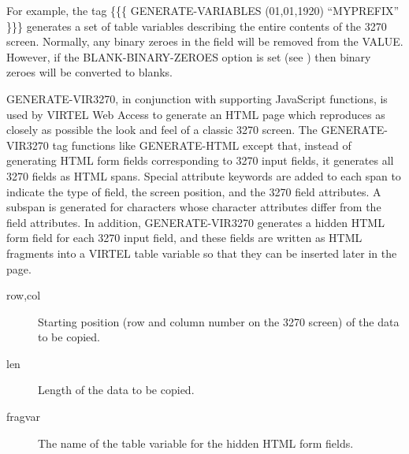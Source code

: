 \documentclass[letterpaper,10pt,english]{sphinxmanual}
\begin{document}
For example, the tag \{\{\{ GENERATE-VARIABLES (01,01,1920) “MYPREFIX” \}\}\} generates a set of table variables describing the entire contents of the 3270 screen. Normally, any binary zeroes in the field will be removed from the VALUE. However, if the BLANK-BINARY-ZEROES option is set (see {\hyperref[\detokenize{User_Guide:v457ug-setting-local-options}]{}}) then binary zeroes will be converted to blanks.


GENERATE-VIR3270, in conjunction with supporting JavaScript functions, is used by VIRTEL Web Access to generate an HTML page which reproduces as closely as possible the look and feel of a classic 3270 screen.
The GENERATE-VIR3270 tag functions like GENERATE-HTML except that, instead of generating HTML form fields corresponding to 3270 input fields, it generates all 3270 fields as HTML spans. Special attribute keywords are added to each span to indicate the type of field, the screen position, and the 3270 field attributes. A subspan is generated for characters whose character attributes differ from the field attributes. In addition, GENERATE-VIR3270 generates a hidden HTML form field for each 3270 input field, and these fields are written as HTML fragments into a VIRTEL table variable so that they can be inserted later in the page.

\begin{sphinxVerbatim}[commandchars=\\\{\}]
      
\end{sphinxVerbatim}
\begin{description}
\item[{row,col}] \leavevmode
Starting position (row and column number on the 3270 screen) of the data to be copied.

\item[{len}] \leavevmode
Length of the data to be copied.

\item[{fragvar}] \leavevmode
The name of the table variable for the hidden HTML form fields.

\end{description}
\end{document}
